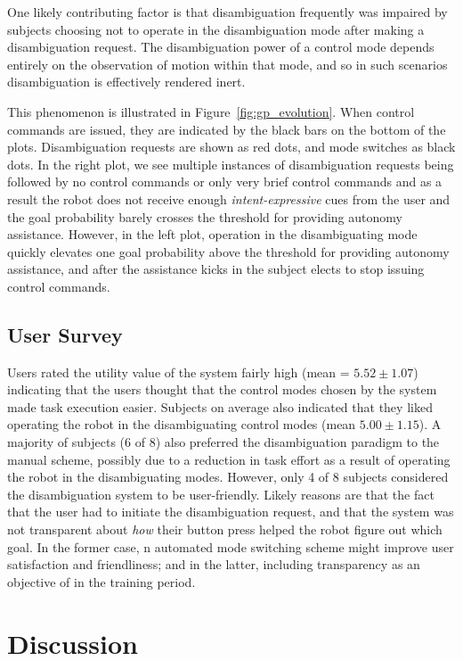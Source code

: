 \documentclass[natbib, twocolumn]{svjour3}          %
\begin{document}
One likely contributing factor is that disambiguation frequently was impaired by subjects choosing not to operate in the disambiguation mode after making a disambiguation request. The disambiguation power of a control mode depends entirely on the observation of motion within that mode, and so in such scenarios disambiguation is effectively rendered inert.

This phenomenon is illustrated in Figure~\ref{fig:gp_evolution}. When control commands are issued, they are indicated by the black bars on the bottom of the plots. Disambiguation requests are shown as red dots, and mode switches as black dots. In the right plot, we see multiple instances of disambiguation requests being followed by no control commands or only very brief control commands and as a result the robot does not receive enough \textit{intent-expressive} cues from the user and the goal probability barely crosses the threshold for providing autonomy assistance. However, in the left plot, operation in the disambiguating mode quickly elevates one goal probability above the threshold for providing autonomy assistance, and after the assistance kicks in the subject elects to stop issuing control commands.

\subsection{User Survey}

Users rated the utility value of the system fairly high (mean = $5.52 \pm 1.07$) indicating that the users thought that the control modes chosen by the system made task execution easier. Subjects on average also indicated that they liked operating the robot in the disambiguating control modes (mean $5.00 \pm 1.15$). A majority of subjects (6 of 8) also preferred the disambiguation paradigm to the manual scheme, possibly due to a reduction in task effort as a result of operating the robot in the disambiguating modes.  However, only 4 of 8 subjects considered the disambiguation system to be user-friendly. Likely reasons are that the fact that the user had to initiate the disambiguation request, and that the system was not transparent about \textit{how} their button press helped the robot figure out which goal. In the former case, n automated mode switching scheme might improve user satisfaction and friendliness; and in the latter, including transparency as an objective of in the training period.
%
\section{Discussion}\label{sec:discussions}
 
\end{document}
